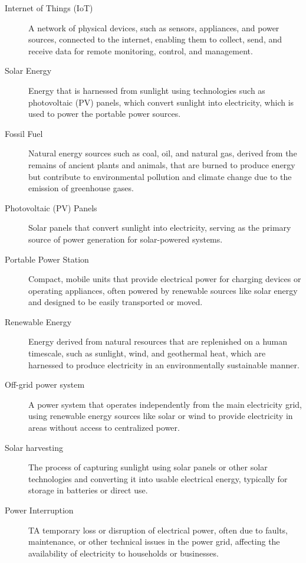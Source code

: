 {\begin{description}
	\item[Internet of Things (IoT)] 
	A network of physical devices, such as sensors, appliances, and power sources, connected to the internet, enabling them to collect, send, and receive data for remote monitoring, control, and management.
	
	\item[Solar Energy] 
	Energy that is harnessed from sunlight using technologies such as photovoltaic (PV) panels, which convert sunlight into electricity, which is used to power the portable power sources.
	
	\item[Fossil Fuel] 
	Natural energy sources such as coal, oil, and natural gas, derived from the remains of ancient plants and animals, that are burned to produce energy but contribute to environmental pollution and climate change due to the emission of greenhouse gases.
	
	\item[Photovoltaic (PV) Panels] 
	Solar panels that convert sunlight into electricity, serving as the primary source of power generation for solar-powered systems.
	
	\item[Portable Power Station] 
	Compact, mobile units that provide electrical power for charging devices or operating appliances, often powered by renewable sources like solar energy and designed to be easily transported or moved.
	
	\item[Renewable Energy] 
	Energy derived from natural resources that are replenished on a human timescale, such as sunlight, wind, and geothermal heat, which are harnessed to produce electricity in an environmentally sustainable manner.
	
	\item[Off-grid power system] 
	A power system that operates independently from the main electricity grid, using renewable energy sources like solar or wind to provide electricity in areas without access to centralized power.
	
	\item[Solar harvesting] 
	The process of capturing sunlight using solar panels or other solar technologies and converting it into usable electrical energy, typically for storage in batteries or direct use.
	
	\item[Power Interruption] 
	TA temporary loss or disruption of electrical power, often due to faults, maintenance, or other technical issues in the power grid, affecting the availability of electricity to households or businesses.



\end{description}

}
